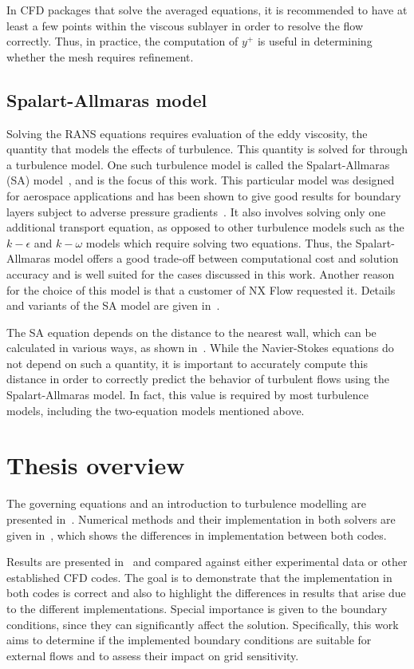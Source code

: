 In CFD packages that solve the averaged equations, it is recommended to have at least a few points within the viscous sublayer in order to resolve the flow correctly. Thus, in practice, the computation of $y^+$ is useful in determining whether the mesh requires refinement.
%
%
\subsection{Spalart-Allmaras model}
\label{sec:introsa}
%
%
Solving the RANS equations requires evaluation of the eddy viscosity, the quantity that models the effects of turbulence. This quantity is solved for through a turbulence model. One such turbulence model is called the Spalart-Allmaras (SA) model~\cite{spalart1994one}, and is the focus of this work. This particular model was designed for aerospace applications and has been shown to give good results for boundary layers subject to adverse pressure gradients~\cite{spalart1994one}. It also involves solving only one additional transport equation, as opposed to other turbulence models such as the $k-\epsilon$ and $k-\omega$ models which require solving two equations. Thus, the Spalart-Allmaras model offers a good trade-off between computational cost and solution accuracy and is well suited for the cases discussed in this work. Another reason for the choice of this model is that a customer of NX Flow requested it. Details and variants of the SA model are given in~.

The SA equation depends on the distance to the nearest wall, which can be calculated in various ways, as shown in~. While the Navier-Stokes equations do not depend on such a quantity, it is important to accurately compute this distance in order to correctly predict the behavior of turbulent flows using the Spalart-Allmaras model. In fact, this value is required by most turbulence models, including the two-equation models mentioned above.

\section{Thesis overview}
The governing equations and an introduction to turbulence modelling are presented in~. Numerical methods and their implementation in both solvers are given in~, which shows the differences in implementation between both codes.

Results are presented in~ and compared against either experimental data or other established CFD codes. The goal is to demonstrate that the implementation in both codes is correct and also to highlight the differences in results that arise due to the different implementations. Special importance is given to the boundary conditions, since they can significantly affect the solution. Specifically, this work aims to determine if the implemented boundary conditions are suitable for external flows and to assess their impact on grid sensitivity.

